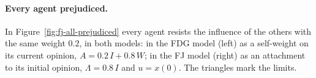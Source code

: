 \paragraph{Every agent prejudiced.}
In Figure~\ref{fig:fj-all-prejudiced} every agent resists the influence of the others
with the same weight $0.2$, in both models: in the FDG model (left) as a self-weight on
its current opinion, $A = 0.2\, I + 0.8\, W$; in the FJ model (right) as an attachment
to its initial opinion, $\Lambda = 0.8\, I$ and $u = x(0)$. The triangles mark the
limits.

